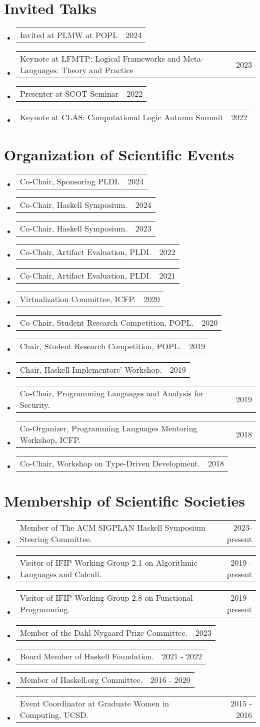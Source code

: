 \documentclass[letterpaper,11pt]{article}
\makeatletter
\newcommand{\resumeProjectHeading}[2]{
    \item
    \begin{tabular*}{0.97\textwidth}{l@{\extracolsep{\fill}}r}
      \small#1 & #2 \\
    \end{tabular*}\vspace{-7pt}
}
\newcommand{\resumeSubHeadingListStart}{\begin{itemize}[leftmargin=0.15in, label={}]}
\newcommand{\resumeSubHeadingListEnd}{\end{itemize}}
\makeatother
\begin{document}
 \section{Invited Talks}
 \resumeSubHeadingListStart
 \resumeProjectHeading
 {Invited at PLMW at POPL}{2024}
 \resumeProjectHeading
 {Keynote at LFMTP: Logical Frameworks and Meta-Languages: Theory and Practice}{2023}
 \resumeProjectHeading
 {Presenter at SCOT Seminar}{2022}
 \resumeProjectHeading
 {Keynote at CLAS: Computational Logic Autumn Summit}{2022}
 \resumeSubHeadingListEnd


 \section{Organization of Scientific Events}
\resumeSubHeadingListStart
\resumeProjectHeading
    {Co-Chair, Sponsoring PLDI.}{2024}
\resumeProjectHeading
    {Co-Chair, Haskell Symposium.}{2024}
\resumeProjectHeading
    {Co-Chair, Haskell Symposium.}{2023}
\resumeProjectHeading
    {Co-Chair, Artifact Evaluation, PLDI.}{2022}
\resumeProjectHeading
    {Co-Chair, Artifact Evaluation, PLDI.}{2021}
\resumeProjectHeading
    {Virtualization Committee, ICFP.}{2020}
\resumeProjectHeading
    {Co-Chair, Student Research Competition, POPL.}{2020}
\resumeProjectHeading
    {Chair, Student Research Competition, POPL.}{2019}
\resumeProjectHeading
    {Chair, Haskell Implementors’ Workshop.}{2019}
\resumeProjectHeading
    {Co-Chair, Programming Languages and Analysis for Security.}{2019}
\resumeProjectHeading
    {Co-Organizer, Programming Languages Mentoring Workshop, ICFP.}{2018}
\resumeProjectHeading
    {Co-Chair, Workshop on Type-Driven Development.}{2018}
\resumeSubHeadingListEnd

\section{Membership of Scientific Societies}
\resumeSubHeadingListStart
\resumeProjectHeading
    {Member of The ACM SIGPLAN Haskell Symposium Steering Committee.}{2023-present}
\resumeProjectHeading
    {Visitor of IFIP Working Group 2.1 on Algorithmic Languages and Calculi.}{2019 - present}
\resumeProjectHeading
    {Visitor of IFIP Working Group 2.8 on Functional Programming.}{2019 - present}
\resumeProjectHeading
    {Member of the Dahl-Nygaard Prize Committee.}{2023}
\resumeProjectHeading
    {Board Member of Haskell Foundation.}{2021 - 2022}
\resumeProjectHeading
    {Member of Haskell.org Committee.}{2016 - 2020}
\resumeProjectHeading
    {Event Coordinator at Graduate Women in Computing, UCSD.}{2015 - 2016}
\resumeSubHeadingListEnd
\end{document}
